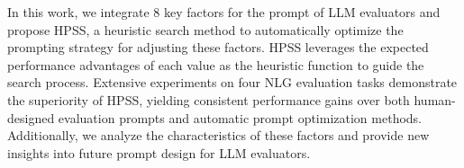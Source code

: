 In this work, we integrate 8 key factors for the prompt of LLM evaluators and propose HPSS, a heuristic search method to automatically optimize the prompting strategy for adjusting these factors. 
HPSS leverages the expected performance advantages of each value as the heuristic function to guide the search process. 
Extensive experiments on four NLG evaluation tasks demonstrate the superiority of HPSS, yielding consistent performance gains over both human-designed evaluation prompts and automatic prompt optimization methods. 
Additionally, we analyze the characteristics of these factors and provide new insights into future prompt design for LLM evaluators.